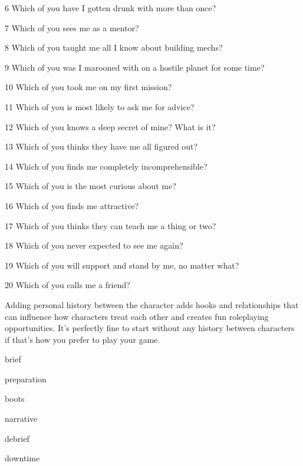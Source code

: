  6         Which of you have I gotten drunk with more than once?

 7         Which of you sees me as a mentor?

 8         Which of you taught me all I know about building mechs?

 9         Which of you was I marooned with on a hostile planet for some time?

10       Which of you took me on my first mission?

  11       Which of you is most likely to ask me for advice?

  12       Which of you knows a deep secret of mine? What is it?

  13       Which of you thinks they have me all figured out?

  14       Which of you finds me completely incomprehensible?

  15       Which of you is the most curious about me?

  16       Which of you finds me attractive?

  17       Which of you thinks they can teach me a thing or two?

  18       Which of you never expected to see me again?

  19       Which of you will support and stand by me, no matter what?

  20       Which of you calls me a friend?

Adding personal history between the character adds hooks and relationships that can influence
how characters treat each other and creates fun roleplaying opportunities. It’s perfectly fine to
start without any history between characters if that’s how you prefer to play your game.

{brief}

{preparation}

{boots}

{narrative}

{debrief}

{downtime}
